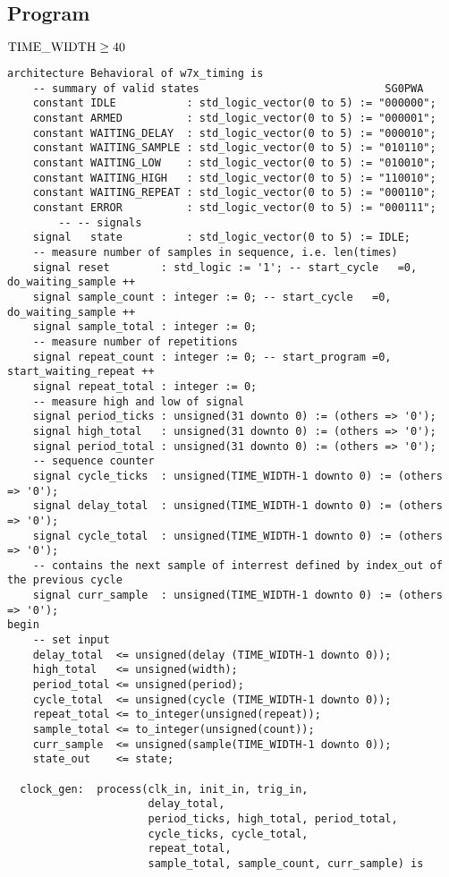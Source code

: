\documentclass{article}
\begin{document}
\subsection*{Program}
$\rm{TIME\_WIDTH} \geq 40$
\begin{lstlisting}
architecture Behavioral of w7x_timing is
    -- summary of valid states                             SG0PWA
    constant IDLE           : std_logic_vector(0 to 5) := "000000";
    constant ARMED          : std_logic_vector(0 to 5) := "000001";
    constant WAITING_DELAY  : std_logic_vector(0 to 5) := "000010";
    constant WAITING_SAMPLE : std_logic_vector(0 to 5) := "010110";
    constant WAITING_LOW    : std_logic_vector(0 to 5) := "010010";
    constant WAITING_HIGH   : std_logic_vector(0 to 5) := "110010";
    constant WAITING_REPEAT : std_logic_vector(0 to 5) := "000110";
    constant ERROR          : std_logic_vector(0 to 5) := "000111";
		-- -- signals
    signal   state          : std_logic_vector(0 to 5) := IDLE;
    -- measure number of samples in sequence, i.e. len(times)
    signal reset        : std_logic := '1'; -- start_cycle   =0, do_waiting_sample ++
    signal sample_count : integer := 0; -- start_cycle   =0, do_waiting_sample ++
    signal sample_total : integer := 0;
    -- measure number of repetitions
    signal repeat_count : integer := 0; -- start_program =0, start_waiting_repeat ++
    signal repeat_total : integer := 0;
    -- measure high and low of signal
    signal period_ticks : unsigned(31 downto 0) := (others => '0');
    signal high_total   : unsigned(31 downto 0) := (others => '0');
    signal period_total : unsigned(31 downto 0) := (others => '0');
    -- sequence counter
    signal cycle_ticks  : unsigned(TIME_WIDTH-1 downto 0) := (others => '0');
    signal delay_total  : unsigned(TIME_WIDTH-1 downto 0) := (others => '0');
    signal cycle_total  : unsigned(TIME_WIDTH-1 downto 0) := (others => '0');
    -- contains the next sample of interrest defined by index_out of the previous cycle
    signal curr_sample  : unsigned(TIME_WIDTH-1 downto 0) := (others => '0');
begin
    -- set input
    delay_total  <= unsigned(delay (TIME_WIDTH-1 downto 0));
    high_total   <= unsigned(width);
    period_total <= unsigned(period);
    cycle_total  <= unsigned(cycle (TIME_WIDTH-1 downto 0));
    repeat_total <= to_integer(unsigned(repeat));
    sample_total <= to_integer(unsigned(count));
    curr_sample  <= unsigned(sample(TIME_WIDTH-1 downto 0));
    state_out    <= state;

  clock_gen:  process(clk_in, init_in, trig_in,
                      delay_total,
                      period_ticks, high_total, period_total,
                      cycle_ticks, cycle_total,
                      repeat_total,
                      sample_total, sample_count, curr_sample) is
  

\end{lstlisting}
\end{document}
